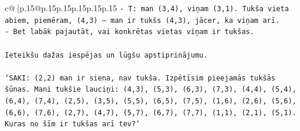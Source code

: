 \documentclass{article}
\begin{document}
{\begin{supertabular}{c@{$\;$}|p{.15\linewidth}@{}p{.15\linewidth}p{.15\linewidth}p{.15\linewidth}p{.15\linewidth}p{.15\linewidth}}
{{{\texttt{{-} T: man (3,4), viņam (3,1). Tukša vieta abiem, piemēram, (4,3) — man ir tukšs (4,3), jācer, ka viņam arī.} \\
\texttt{{-} Bet labāk pajautāt, vai konkrētas vietas viņam ir tukšas.} \\
\\ 
\texttt{Ieteikšu dažas iespējas un lūgšu apstiprinājumu.} \\
\\ 
\texttt{`SAKI: (2,2) man ir siena, nav tukša. Izpētīsim pieejamās tukšās šūnas. Mani tukšie lauciņi: (4,3), (5,3), (6,3), (7,3), (4,4), (5,4), (6,4), (7,4), (2,5), (3,5), (5,5), (6,5), (7,5), (1,6), (2,6), (5,6), (6,6), (7,6), (2,7), (4,7), (5,7), (6,7), (7,7), (1,1), (2,1), (5,1). Kuras no šīm ir tukšas arī tev?`} \\
            }
        }
    }
     \\ \\


\end{supertabular}}
\end{document}
